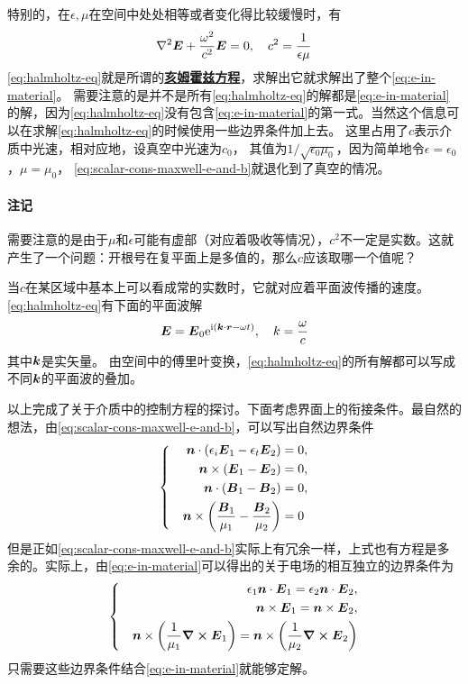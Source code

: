 \documentclass[UTF8, a4paper]{ctexart}
\newcommand*{\comment}{\paragraph{注记}}
\newcommand*{\ii}{\mathrm{i}}
\newcommand*{\ee}{\mathrm{e}}
\newcommand*{\concept}[1]{\underline{\textbf{#1}}}
\newenvironment{bigcase}{\left\{\quad\begin{aligned}}{\end{aligned}\right.}
\begin{document}
特别的，在$\epsilon, \mu$在空间中处处相等或者变化得比较缓慢时，有
\begin{equation}
    \laplacian \vb*{E} + \frac{\omega^2}{c^2} \vb*{E} = 0, \quad c^2 = \frac{1}{\epsilon \mu}
    \label{eq:halmholtz-eq}
\end{equation}
\eqref{eq:halmholtz-eq}就是所谓的\concept{亥姆霍兹方程}，求解出它就求解出了整个\eqref{eq:e-in-material}。
需要注意的是并不是所有\eqref{eq:halmholtz-eq}的解都是\eqref{eq:e-in-material}的解，因为\eqref{eq:halmholtz-eq}没有包含\eqref{eq:e-in-material}的第一式。当然这个信息可以在求解\eqref{eq:halmholtz-eq}的时候使用一些边界条件加上去。
这里占用了$c$表示介质中光速，相对应地，设真空中光速为$c_0$，
其值为$1/\sqrt{\epsilon_0 \mu_0}$，因为简单地令$\epsilon=\epsilon_0$，$\mu = \mu_0$，
\eqref{eq:scalar-cons-maxwell-e-and-b}就退化到了真空的情况。

\comment 需要注意的是由于$\mu$和$\epsilon$可能有虚部（对应着吸收等情况），$c^2$不一定是实数。这就产生了一个问题：开根号在复平面上是多值的，那么$c$应该取哪一个值呢？

当$c$在某区域中基本上可以看成常的实数时，它就对应着平面波传播的速度。\eqref{eq:halmholtz-eq}有下面的平面波解
\begin{equation}
    \vb*{E} = \vb*{E}_0 \ee^{\ii(\vb*{k} \cdot \vb*{r} - \omega t)}, \quad k = \frac{\omega}{c}
    \label{eq:plane-wave}
\end{equation}
其中$\vb*{k}$是实矢量。
由空间中的傅里叶变换，\eqref{eq:halmholtz-eq}的所有解都可以写成不同$\vb*{k}$的平面波的叠加。

以上完成了关于介质中的控制方程的探讨。下面考虑界面上的衔接条件。最自然的想法，由\eqref{eq:scalar-cons-maxwell-e-and-b}，可以写出自然边界条件
\[
    \begin{bigcase}
        \vb*{n} \cdot (\epsilon_i \vb*{E}_1 - \epsilon_t \vb*{E}_2) &= 0, \\
        \vb*{n} \times (\vb*{E}_1 - \vb*{E}_2) &= 0, \\
        \vb*{n} \cdot (\vb*{B}_1 - \vb*{B}_2) &= 0, \\
        \vb*{n} \times \left( \frac{\vb*{B}_1}{\mu_1} - \frac{\vb*{B}_2}{\mu_2} \right) &= 0
    \end{bigcase}
\]
但是正如\eqref{eq:scalar-cons-maxwell-e-and-b}实际上有冗余一样，上式也有方程是多余的。实际上，由\eqref{eq:e-in-material}可以得出的关于电场的相互独立的边界条件为
\begin{equation}
    \left\{\quad
        \begin{aligned}
            \epsilon_1 \vb*{n} \cdot \vb*{E}_1 = \epsilon_2 \vb*{n} \cdot \vb*{E}_2, \\
            \vb*{n} \times \vb*{E}_1 = \vb*{n} \times \vb*{E}_2, \\
            \vb*{n} \times \left( \frac{1}{\mu_1} \curl{\vb*{E}_1} \right) = \vb*{n} \times \left(\frac{1}{\mu_2} \curl{\vb*{E}_2} \right)
        \end{aligned}
    \right.
    \label{eq:e-bound-condition}
\end{equation}
只需要这些边界条件结合\eqref{eq:e-in-material}就能够定解。
\end{document}
